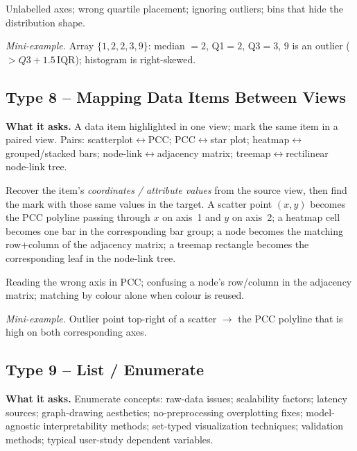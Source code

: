 \begin{pitfall}
Unlabelled axes; wrong quartile placement; ignoring outliers; bins that hide
the distribution shape.
\end{pitfall}

\textit{Mini-example.} Array $\{1,2,2,3,9\}$: median $=2$, Q1$=2$, Q3$=3$,
$9$ is an outlier ($> Q3+1.5\,\mathrm{IQR}$); histogram is right-skewed.

\subsection{Type 8 -- Mapping Data Items Between Views}

\textbf{What it asks.} A data item highlighted in one view; mark the same item
in a paired view. Pairs: scatterplot$\leftrightarrow$PCC;
PCC$\leftrightarrow$star plot; heatmap$\leftrightarrow$grouped/stacked bars;
node-link$\leftrightarrow$adjacency matrix; treemap$\leftrightarrow$rectilinear
node-link tree.

\begin{exambox}
Recover the item's \emph{coordinates / attribute values} from the source view,
then find the mark with those same values in the target. A scatter point
$(x,y)$ becomes the PCC polyline passing through $x$ on axis~1 and $y$ on
axis~2; a heatmap cell becomes one bar in the corresponding bar group; a
node becomes the matching row+column of the adjacency matrix; a treemap
rectangle becomes the corresponding leaf in the node-link tree.
\end{exambox}

\begin{pitfall}
Reading the wrong axis in PCC; confusing a node's row/column in the adjacency
matrix; matching by colour alone when colour is reused.
\end{pitfall}

\textit{Mini-example.} Outlier point top-right of a scatter $\to$ the PCC
polyline that is high on both corresponding axes.

\subsection{Type 9 -- List / Enumerate}

\textbf{What it asks.} Enumerate concepts: raw-data issues; scalability factors;
latency sources; graph-drawing aesthetics; no-preprocessing overplotting fixes;
model-agnostic interpretability methods; set-typed visualization techniques;
validation methods; typical user-study dependent variables.

